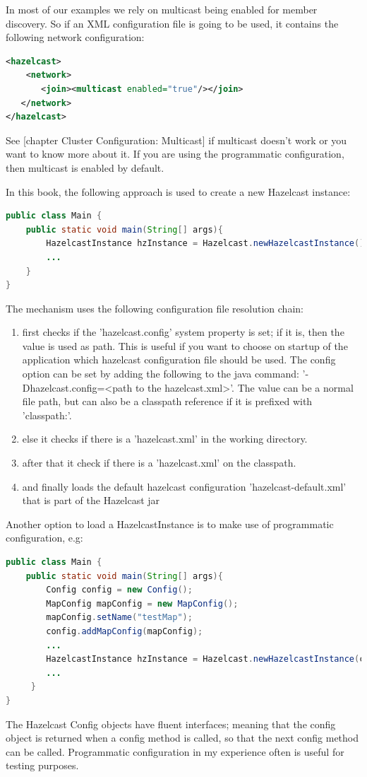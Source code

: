 In most of our examples we rely on multicast being enabled for member discovery. So if an XML configuration file is going to be used, it contains the following network configuration:
\begin{lstlisting}[language=xml]
<hazelcast>
    <network>
       <join><multicast enabled="true"/></join>
   </network>
</hazelcast>
\end{lstlisting}
See [chapter Cluster Configuration: Multicast] if multicast doesn't work or you want to know more about it. If you are using the programmatic configuration, then multicast is enabled by default.

In this book, the following approach is used to create a new Hazelcast instance:
\begin{lstlisting}[language=java]
public class Main {
    public static void main(String[] args){
        HazelcastInstance hzInstance = Hazelcast.newHazelcastInstance();
        ...
    }
}
\end{lstlisting}
The mechanism uses the following configuration file resolution chain:
\begin{enumerate}
\item first checks if the 'hazelcast.config' system property is set; if it is, then the value is used as path. This is useful if you want to choose on startup of the application which hazelcast configuration file should be used. The config option can be set by adding the following to the java command: '-Dhazelcast.config=<path to the hazelcast.xml>'. The value can be a normal file path, but can also be a classpath reference if it is prefixed with 'classpath:'. 
\item else it checks if there is a 'hazelcast.xml' in the working directory.
\item after that it check if there is a 'hazelcast.xml' on the classpath. 
\item and finally loads the default hazelcast configuration 'hazelcast-default.xml' that is part of the Hazelcast jar
\end{enumerate}

Another option to load a HazelcastInstance is to make use of programmatic configuration, e.g: 
\begin{lstlisting}[language=java]
public class Main {
    public static void main(String[] args){
        Config config = new Config();
        MapConfig mapConfig = new MapConfig();
        mapConfig.setName("testMap");
        config.addMapConfig(mapConfig);
        ...
        HazelcastInstance hzInstance = Hazelcast.newHazelcastInstance(config);
        ...
     }
}
\end{lstlisting}
The Hazelcast Config objects have fluent interfaces; meaning that the config object is returned when a config method is called, so that the next config method can be called. Programmatic configuration in my experience often is useful for testing purposes. 

